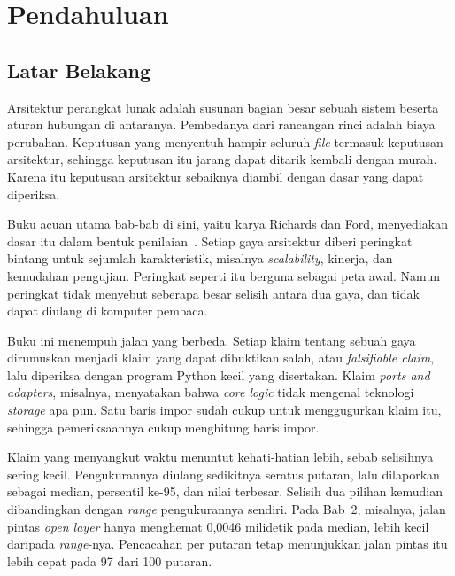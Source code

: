 \chapter{Pendahuluan}
\label{ch:pendahuluan}

\section*{Latar Belakang}

Arsitektur perangkat lunak adalah susunan bagian besar sebuah sistem beserta
aturan hubungan di antaranya. Pembedanya dari rancangan rinci adalah biaya
perubahan. Keputusan yang menyentuh hampir seluruh \textit{file} termasuk
keputusan arsitektur, sehingga keputusan itu jarang dapat ditarik kembali dengan
murah. Karena itu keputusan arsitektur sebaiknya diambil dengan dasar yang dapat
diperiksa.

Buku acuan utama bab-bab di sini, yaitu karya Richards dan Ford, menyediakan
dasar itu dalam bentuk penilaian~\cite{richards2020fundamentals}. Setiap gaya
arsitektur diberi peringkat bintang untuk sejumlah karakteristik, misalnya
\textit{scalability}, kinerja, dan kemudahan pengujian. Peringkat seperti itu
berguna sebagai peta awal. Namun peringkat tidak menyebut seberapa besar selisih
antara dua gaya, dan tidak dapat diulang di komputer pembaca.

Buku ini menempuh jalan yang berbeda. Setiap klaim tentang sebuah gaya
dirumuskan menjadi klaim yang dapat dibuktikan salah, atau \textit{falsifiable
claim}, lalu diperiksa dengan program Python kecil yang disertakan. Klaim
\textit{ports and adapters}, misalnya, menyatakan bahwa \textit{core logic}
tidak mengenal teknologi \textit{storage} apa pun. Satu baris impor sudah cukup
untuk menggugurkan klaim itu, sehingga pemeriksaannya cukup menghitung baris
impor.

Klaim yang menyangkut waktu menuntut kehati-hatian lebih, sebab selisihnya
sering kecil. Pengukurannya diulang sedikitnya seratus putaran, lalu dilaporkan
sebagai median, persentil ke-95, dan nilai terbesar. Selisih dua pilihan
kemudian dibandingkan dengan \textit{range} pengukurannya sendiri. Pada Bab~2,
misalnya, jalan pintas \textit{open layer} hanya menghemat 0,0046 milidetik pada
median, lebih kecil daripada \textit{range}-nya. Pencacahan per putaran tetap
menunjukkan jalan pintas itu lebih cepat pada 97 dari 100 putaran.

